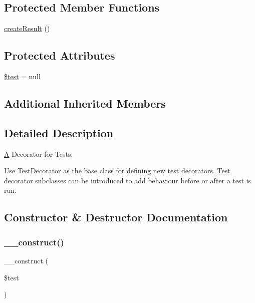 \subsection*{Protected Member Functions}
\begin{DoxyCompactItemize}
\item 
\mbox{\hyperlink{class_p_h_p_unit___extensions___test_decorator_a3f3ab385dd8747091f1bdfbb11ed6eca}{create\+Result}} ()
\end{DoxyCompactItemize}
\subsection*{Protected Attributes}
\begin{DoxyCompactItemize}
\item 
\mbox{\hyperlink{class_p_h_p_unit___extensions___test_decorator_a31daebf88fc668f410293e2c70cea3fc}{\$test}} = null
\end{DoxyCompactItemize}
\subsection*{Additional Inherited Members}


\subsection{Detailed Description}
\mbox{\hyperlink{class_a}{A}} Decorator for Tests.

Use Test\+Decorator as the base class for defining new test decorators. \mbox{\hyperlink{class_test}{Test}} decorator subclasses can be introduced to add behaviour before or after a test is run. 

\subsection{Constructor \& Destructor Documentation}
\mbox{\label{class_p_h_p_unit___extensions___test_decorator_a22abccb35adabf0f3b93ecd5cbf34d19}} 
\subsubsection{\texorpdfstring{\+\_\+\+\_\+construct()}{\_\_construct()}}
{\footnotesize\ttfamily \+\_\+\+\_\+construct (\begin{DoxyParamCaption}\item[{\mbox{\hyperlink{interface_p_h_p_unit___framework___test}{P\+H\+P\+Unit\+\_\+\+Framework\+\_\+\+Test}}}]{\$test }\end{DoxyParamCaption})}

